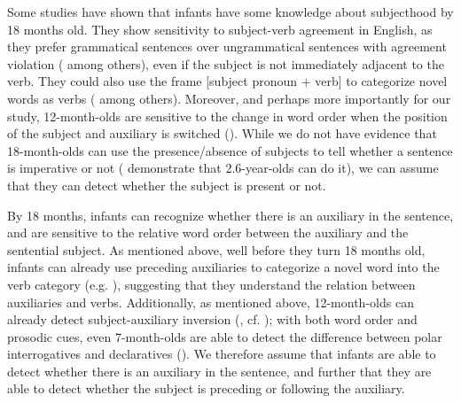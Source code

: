  Some studies have shown that infants have some knowledge about subjecthood by 18 months old. They show sensitivity to subject-verb agreement in English, as they prefer grammatical sentences over ungrammatical sentences with agreement violation (\cite{soderstrom2002agr, soderstrom2007sv, nazzi2011} among others), even if the subject is not immediately adjacent to the verb. They could also use the frame [subject pronoun + verb] to categorize novel words as verbs (\cite{babineau202014func,peterson2006aux, mintz2006verb,shi2014functional} among others). Moreover, and perhaps more importantly for our study, 12-month-olds are sensitive to the change in word order when the position of the subject and auxiliary is switched (\cite{geffenmintz2015wordorder}). While we do not have evidence that 18-month-olds can use the presence/absence of subjects to tell whether a sentence is imperative or not (\cite{orfitellihyams2012subj} demonstrate that 2.6-year-olds can do it), we can assume that they can detect whether the subject is present or not.  %


 By 18 months, infants can recognize whether there is an auxiliary in the sentence, and are sensitive to the relative word order between the auxiliary and the sentential subject. As mentioned above, well before they turn 18 months old, infants can already use preceding auxiliaries to categorize a novel word into the verb category (e.g. \cite{peterson2006aux, mintz2006verb}), suggesting that they understand the relation between auxiliaries and verbs. Additionally, as mentioned above, 12-month-olds can already detect subject-auxiliary inversion (\cite{geffenmintz2015wordorder}, cf. \cite{erreich1984,ambridge2006auxinvert}); with both word order and prosodic cues, even 7-month-olds are able to detect the difference between polar interrogatives and declaratives (\cite{geffenmintz2011}). We therefore assume that infants are able to detect whether there is an auxiliary in the sentence, and further that they are able to detect whether the subject is preceding or following the auxiliary.

